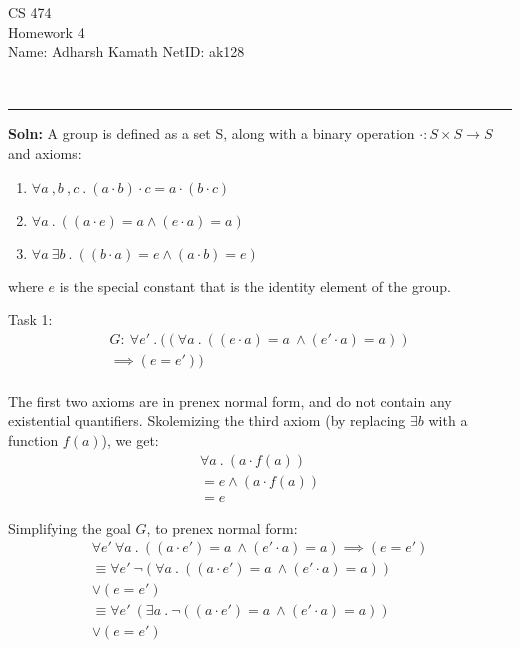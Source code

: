 \documentclass[12pt,letterpaper, onecolumn]{exam}
\begin{document}
\begingroup
\centering
\LARGE CS 474\\
\large Homework 4 \\[0.5em]
\endgroup
\begingroup
\normalsize \quad\quad\quad Name: Adharsh Kamath \quad\quad\quad \quad\quad\quad \quad\quad\quad \quad\quad\quad \quad  NetID: ak128 \par\
\endgroup
\rule{17cm}{0.4pt}
\pointsdroppedatright   %
\printanswers
\renewcommand{\solutiontitle}{\noindent\textbf{Soln:}\enspace}
\newcommand{\cheading}[1]{{\underline{\textit{#1}}}}

\renewcommand{\questionshook}{%
	\setlength{\leftmargin}{18pt}%
	\setlength{\labelwidth}{-\labelsep}%
}
\begin{questions}
	\question[]
	\solutiontitle
	A group is defined as a set S, along with a binary operation $ \cdot : S \times S \rightarrow S $ and axioms:
	\begin{enumerate}
		\item $\forall a \:,  b \:, c \:.\: (a \cdot b) \cdot c = a \cdot (b \cdot c)$
		\item $\forall a \:.\: ((a \cdot e) = a \land (e \cdot a) = a) $
		\item $\forall a \: \exists b \:.\: ((b \cdot a) = e \land (a \cdot b) = e)$
	\end{enumerate}

	where $ e $  is the special constant that is the identity element of the group.

	Task 1: 
	\begin{align*}
		G : \: \forall e' \:.\: ((\forall a \:.\: ((e \cdot a) = a \: \land (e' \cdot a) = a))  \\ \implies (e = e'))  \\
	\end{align*}

	The first two axioms are in prenex normal form, and do not contain any existential quantifiers.
	Skolemizing the third axiom (by replacing $ \exists b $ with a function $ f(a) $), we get:
	\begin{align*}
		\forall a \:.\: (a \cdot f(a))  \\ = e \land (a \cdot f(a))  \\ = e
	\end{align*}

	Simplifying the goal $G$, to prenex normal form:
	\begin{align*}
		\forall e' \: \forall a \:.\: ((a \cdot e') = a \: \land (e' \cdot a) = a) \implies (e = e') \\
		\equiv \forall e' \: \neg(\forall a \:.\: ((a \cdot e') = a \: \land (e' \cdot a) = a))  \\ \lor (e = e') \\
		\equiv \forall e' \: (\exists a \:.\: \neg((a \cdot e') = a \: \land (e' \cdot a) = a))  \\ \lor (e = e')
	\end{align*}


\end{questions}
\end{document}
